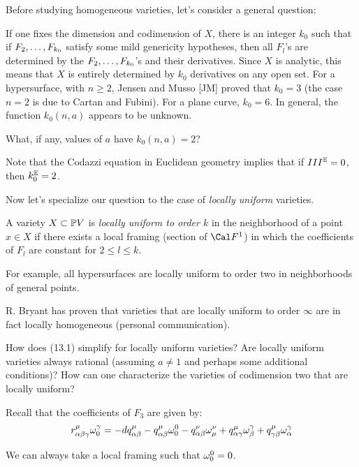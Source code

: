 \endheading
 

Before studying homogeneous varieties, let's consider a general question:

If one fixes the dimension and codimension of $X$, there is an integer
$k_0$ such that if $F_2, \hdots , F_{k_0}$ satisfy some mild genericity
hypotheses, then all $F_l$'s are determined by the 
$F_2, \hdots , F_{k_0}$'s and their derivatives. Since $X$ is analytic,
this means that $X$ is entirely determined by $k_0$ derivatives
on any open set. For a hypersurface, with $n\geq 2$, Jensen and
Musso [JM] proved that $k_0=3$ (the case $n=2$ is due to Cartan
and Fubini).
For a plane curve, $k_0=6$. In general, the function 
$k_0(n,a)$ appears to be unknown.

   What, if any,
values of $a$ have $k_0(n,a)=2$?

\smallpagebreak

Note that the Codazzi equation in Euclidean geometry implies
that if $III^{\Bbb E}=0$, then $k_0^{\Bbb E}=2$.


Now let's specialize our question to the case of {\it locally
uniform} varieties. 

 A variety $X\subset\Bbb P V$ is
{\it locally uniform to order $k$} in the neighborhood of a point $x\in X$
if there exists a local framing (section of $\cf^1$) in which the
coefficients of $F_l$ are constant for $2\leq l\leq k$.

For example, all hypersurfaces are locally uniform to
order two in   neighborhoods of general points.

 R. Bryant has proven that varieties
that are locally uniform to order $\infty$ are in fact
locally homogeneous (personal communication).

 How does (13.1) simplify for
locally uniform varieties? Are locally uniform varieties
always rational (assuming $a\neq 1$ and perhaps some additional
conditions)? How can one characterize the varieties of codimension
two that are locally uniform?

\smallpagebreak

Recall that  the coefficients of $F_3$ are given by:
$$
r^{\mu}_{{\alpha} {\beta}{\gamma}}\omega^{\gamma}_0 =
- dq^{\mu}_{{\alpha} {\beta}} -q^{\mu}_{{\alpha} {\beta}}\omega^{0}_{0} -q^{\nu}_{{\alpha} {\beta}}\omega^{\nu}_{\mu}
+q^{\mu}_{{\alpha} {\gamma}}\omega^{\gamma}_{\beta} + q^{\mu}_{{\gamma} {\beta}}\omega^{\gamma}_{\alpha}
$$


We can always take a local framing such that $\omega^{0}_{0} =0$.

